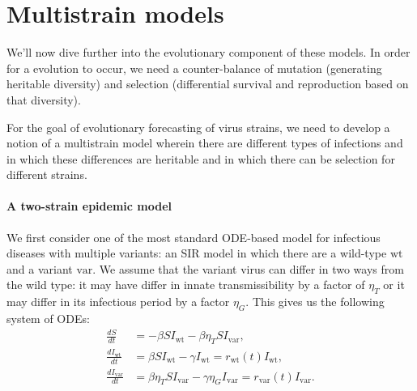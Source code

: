 




\section{Multistrain models}

We'll now dive further into the evolutionary component of these models. 
In order for a evolution to occur, we need a counter-balance of mutation (generating heritable diversity) and selection (differential survival and reproduction based on that diversity).

For the goal of evolutionary forecasting of virus strains, we need to develop a notion of a multistrain model wherein there are different types of infections and in which these differences are heritable and in which there can be selection for different strains.

\paragraph{A two-strain epidemic model}%

We first consider one of the most standard ODE-based model for infectious diseases with multiple variants: an SIR model in which there are a wild-type $\text{wt}$ and a variant $\text{var}$. 
We assume that the variant virus can differ in two ways from the wild type: it may have differ in innate transmissibility by a factor of $\eta_{T}$ or it may differ in its infectious period by a factor $\eta_{G}$. 
This gives us the following system of ODEs:
\begin{align}
    \frac{d S}{d t} &= - \beta S I_{\text{wt}} - \beta \eta_{T} S I_{\text{var}},\\
  \frac{d I_{\text{wt}} }{d t} &= \beta S I_{\text{wt}} - \gamma I_{\text{wt}} = r_{\text{wt}}(t) I_{\text{wt}},\\
  \frac{d I_{\text{var}}}{d t} &= \beta \eta_{T} S I_{\text{var}} - \gamma \eta_{G} I_{\text{var}} = r_{\text{var}}(t) I_{\text{var}}.
\end{align}

